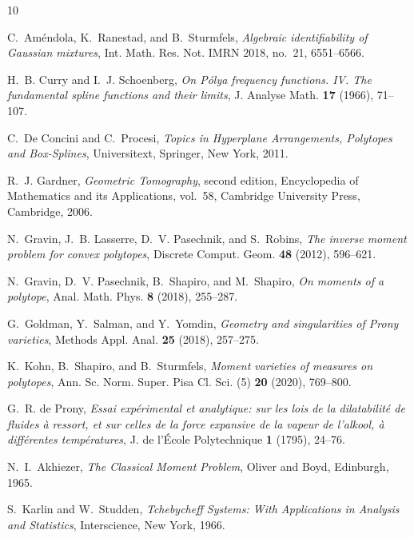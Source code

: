 \documentclass[reqno]{amsart}
\numberwithin{theorem}{section}
\begin{document}
\begin{thebibliography}{10}

\setlength{\itemsep}{-0.4mm}

C.~Am\'endola, K.~Ranestad, and B.~Sturmfels,
\emph{Algebraic identifiability of Gaussian mixtures},
Int. Math. Res. Not. IMRN 2018, no.~21, 6551--6566.

H.~B. Curry and I.~J. Schoenberg,
\emph{On P\'olya frequency functions. IV. The fundamental spline functions and their limits},
J. Analyse Math. \textbf{17} (1966), 71--107.

C.~De Concini and C.~Procesi,
\emph{Topics in Hyperplane Arrangements, Polytopes and Box-Splines},
Universitext, Springer, New York, 2011.

R.~J. Gardner,
\emph{Geometric Tomography},
second edition, Encyclopedia of Mathematics and its Applications, vol.~58,
Cambridge University Press, Cambridge, 2006.

N.~Gravin, J.~B. Lasserre, D.~V. Pasechnik, and S.~Robins,
\emph{The inverse moment problem for convex polytopes},
Discrete Comput. Geom. \textbf{48} (2012), 596--621.

N.~Gravin, D.~V. Pasechnik, B.~Shapiro, and M.~Shapiro,
\emph{On moments of a polytope},
Anal. Math. Phys. \textbf{8} (2018), 255--287.

G.~Goldman, Y.~Salman, and Y.~Yomdin,
\emph{Geometry and singularities of Prony varieties},
Methods Appl. Anal. \textbf{25} (2018), 257--275.

K.~Kohn, B.~Shapiro, and B.~Sturmfels,
\emph{Moment varieties of measures on polytopes},
Ann. Sc. Norm. Super. Pisa Cl. Sci. (5) \textbf{20} (2020), 769--800.

G.~R. de Prony,
\emph{Essai exp\'erimental et analytique: sur les lois de la dilatabilit\'e de fluides \`a ressort, et sur celles de la force expansive de la vapeur de l'alkool, \`a diff\'erentes temp\'eratures},
J. de l'\'Ecole Polytechnique \textbf{1} (1795), 24--76.


N.~I.~Akhiezer,
\emph{The Classical Moment Problem},
Oliver and Boyd, Edinburgh, 1965.

S.~Karlin and W.~Studden,
\emph{Tchebycheff Systems: With Applications in Analysis and Statistics},
Interscience, New York, 1966.

\end{thebibliography}
\end{document}

